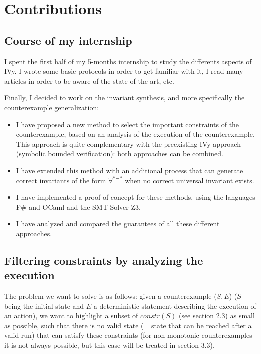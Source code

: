 \documentclass[11pt,a4paper,oldfontcommands,openany]{memoir}
\begin{document}
\chapter{Contributions}

    \section{Course of my internship}

    I spent the first half of my 5-months internship to study the differents aspects of IVy. I wrote some basic protocols in order to get
    familiar with it, I read many articles in order to be aware of the state-of-the-art, etc.

    Finally, I decided to work on the invariant synthesis, and more specifically the counterexample generalization:
    \begin{itemize}
        \item I have proposed a new method to select the important constraints of the counterexample, based on an analysis of the execution of the counterexample.
        This approach is quite complementary with the preexisting IVy approach (symbolic bounded verification): both approaches can be combined. 
        \item I have extended this method with an additional process that can generate correct invariants of the form \(\forall^*\exists^*\)
        when no correct universal invariant exists.
        \item I have implemented a proof of concept for these methods, using the languages F\# and OCaml and the SMT-Solver Z3\cite{z3ref}.        
        \item I have analyzed and compared the guarantees of all these different approaches.
    \end{itemize}

    \section{Filtering constraints by analyzing the execution}

    The problem we want to solve is as follows: given a counterexample (\(S,E\)) (\(S\) being the initial state and \(E\) a deterministic statement describing the execution of an action),
    we want to highlight a subset of \(constr(S)\) (see section 2.3) as small as possible, such that there is no valid state (= state that can be reached after a valid run) that can satisfy these constraints
    (for non-monotonic counterexamples it is not always possible, but this case will be treated in section 3.3).
\end{document}
